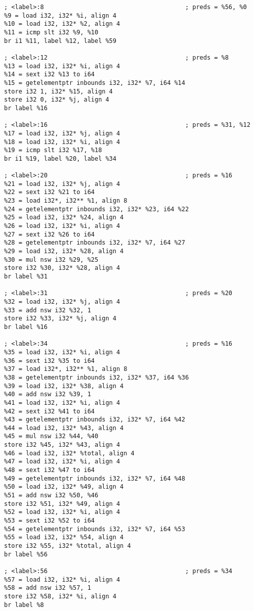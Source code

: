 \begin{verbatim}
; <label>:8                                       ; preds = %56, %0
%9 = load i32, i32* %i, align 4
%10 = load i32, i32* %2, align 4
%11 = icmp slt i32 %9, %10
br i1 %11, label %12, label %59

; <label>:12                                      ; preds = %8
%13 = load i32, i32* %i, align 4
%14 = sext i32 %13 to i64
%15 = getelementptr inbounds i32, i32* %7, i64 %14
store i32 1, i32* %15, align 4
store i32 0, i32* %j, align 4
br label %16

; <label>:16                                      ; preds = %31, %12
%17 = load i32, i32* %j, align 4
%18 = load i32, i32* %i, align 4
%19 = icmp slt i32 %17, %18
br i1 %19, label %20, label %34

; <label>:20                                      ; preds = %16
%21 = load i32, i32* %j, align 4
%22 = sext i32 %21 to i64
%23 = load i32*, i32** %1, align 8
%24 = getelementptr inbounds i32, i32* %23, i64 %22
%25 = load i32, i32* %24, align 4
%26 = load i32, i32* %i, align 4
%27 = sext i32 %26 to i64
%28 = getelementptr inbounds i32, i32* %7, i64 %27
%29 = load i32, i32* %28, align 4
%30 = mul nsw i32 %29, %25
store i32 %30, i32* %28, align 4
br label %31

; <label>:31                                      ; preds = %20
%32 = load i32, i32* %j, align 4
%33 = add nsw i32 %32, 1
store i32 %33, i32* %j, align 4
br label %16

; <label>:34                                      ; preds = %16
%35 = load i32, i32* %i, align 4
%36 = sext i32 %35 to i64
%37 = load i32*, i32** %1, align 8
%38 = getelementptr inbounds i32, i32* %37, i64 %36
%39 = load i32, i32* %38, align 4
%40 = add nsw i32 %39, 1
%41 = load i32, i32* %i, align 4
%42 = sext i32 %41 to i64
%43 = getelementptr inbounds i32, i32* %7, i64 %42
%44 = load i32, i32* %43, align 4
%45 = mul nsw i32 %44, %40
store i32 %45, i32* %43, align 4
%46 = load i32, i32* %total, align 4
%47 = load i32, i32* %i, align 4
%48 = sext i32 %47 to i64
%49 = getelementptr inbounds i32, i32* %7, i64 %48
%50 = load i32, i32* %49, align 4
%51 = add nsw i32 %50, %46
store i32 %51, i32* %49, align 4
%52 = load i32, i32* %i, align 4
%53 = sext i32 %52 to i64
%54 = getelementptr inbounds i32, i32* %7, i64 %53
%55 = load i32, i32* %54, align 4
store i32 %55, i32* %total, align 4
br label %56

; <label>:56                                      ; preds = %34
%57 = load i32, i32* %i, align 4
%58 = add nsw i32 %57, 1
store i32 %58, i32* %i, align 4
br label %8


\end{verbatim}
